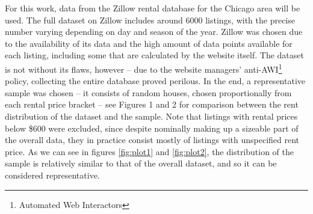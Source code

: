 \documentclass[12pt]{report}
\begin{document}
For this work, data from the Zillow rental database for the Chicago area will be used. The full dataset on Zillow includes around 6000 listings, with the precise number varying depending on day and season of the year. Zillow was chosen due to the availability of its data and the high amount of data points available for each listing, including some that are calculated by the website itself. The dataset is not without its flaws, however -- due to the website managers' anti-AWI\footnote{Automated Web Interactors} policy, collecting the entire database proved perilous. In the end, a representative sample was chosen -- it consists of random houses, chosen proportionally from each rental price bracket -- see Figures 1 and 2 for comparison between the rent distribution of the dataset and the sample. Note that listings with rental prices below \$600 were excluded, since despite nominally making up a sizeable part of the overall data, they in practice consist mostly of listings with unspecified rent price.
As we can see in figures \ref{fig:plot1} and \ref{fig:plot2}, the distribution of the sample is relatively similar to that of the overall dataset, and so it can be considered representative.
\end{document}
